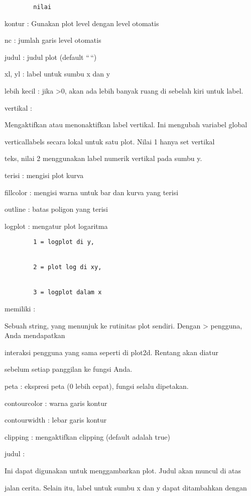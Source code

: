 \documentclass[
]{book}
\begin{document}
\begin{verbatim}
        nilai
\end{verbatim}

kontur : Gunakan plot level dengan level otomatis

nc : jumlah garis level otomatis

judul : judul plot (default ``\,``)

xl, yl : label untuk sumbu x dan y

lebih kecil : jika \textgreater0, akan ada lebih banyak ruang di sebelah kiri untuk label.

vertikal :

Mengaktifkan atau menonaktifkan label vertikal. Ini mengubah variabel global

verticallabels secara lokal untuk satu plot. Nilai 1 hanya set vertikal

teks, nilai 2 menggunakan label numerik vertikal pada sumbu y.

terisi : mengisi plot kurva

fillcolor : mengisi warna untuk bar dan kurva yang terisi

outline : batas poligon yang terisi

logplot : mengatur plot logaritma

\begin{verbatim}
        1 = logplot di y,


        2 = plot log di xy,


        3 = logplot dalam x
\end{verbatim}

memiliki :

Sebuah string, yang menunjuk ke rutinitas plot sendiri. Dengan \textgreater{} pengguna, Anda mendapatkan

interaksi pengguna yang sama seperti di plot2d. Rentang akan diatur

sebelum setiap panggilan ke fungsi Anda.

peta : ekspresi peta (0 lebih cepat), fungsi selalu dipetakan.

contourcolor : warna garis kontur

contourwidth : lebar garis kontur

clipping : mengaktifkan clipping (default adalah true)

judul :

Ini dapat digunakan untuk menggambarkan plot. Judul akan muncul di atas

jalan cerita. Selain itu, label untuk sumbu x dan y dapat ditambahkan dengan
\end{document}
